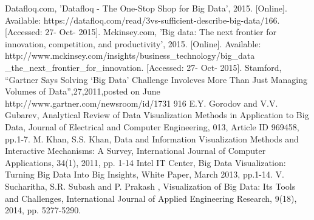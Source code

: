 \begin{thebibliography}{25}
		Datafloq.com, 'Datafloq - The One-Stop Shop for Big Data', 2015. [Online]. Available: https://datafloq.com/read/3vs-sufficient-describe-big-data/166. [Accessed: 27- Oct- 2015].
		Mckinsey.com, 	'Big data: The next frontier for innovation, competition, and productivity', 2015. [Online]. Available: http://www.mckinsey.com/insights/business\_technology/big\_data \_the\_next\_frontier\_for\_innovation. [Accessed: 27- Oct- 2015].
	Stamford, “Gartner Says Solving ‘Big Data’ Challenge Involcves More Than Just Managing
	Volumes of Data”,27,2011,posted on June http://www.gartner.com/newsroom/id/1731 916
	E.Y. Gorodov and V.V. Gubarev, Analytical Review of Data Visualization Methods in Application to Big Data, Journal of Electrical and Computer Engineering, 013, Article ID 969458, pp.1-7.
M. Khan, S.S. Khan, Data and Information Visualization Methods and Interactive Mechanisms: A Survey, International Journal of Computer Applications, 34(1), 2011, pp. 1-14
Intel IT Center, Big Data Visualization: Turning Big Data Into Big
Insights, White Paper, March 2013, pp.1-14.
V. Sucharitha, S.R. Subash and P. Prakash , Visualization of Big
Data: Its Tools and Challenges, International Journal of Applied
Engineering Research, 9(18), 2014, pp. 5277-5290.


\end{thebibliography}
